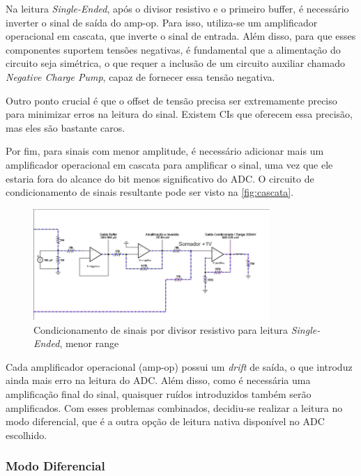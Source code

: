 Na leitura \textit{Single-Ended}, após o divisor resistivo e o primeiro buffer, é necessário inverter o sinal de saída do \gls{amp-op}. Para isso, utiliza-se um amplificador operacional em cascata, que inverte o sinal de entrada. Além disso, para que esses componentes suportem tensões negativas, é fundamental que a alimentação do circuito seja simétrica, o que requer a inclusão de um circuito auxiliar chamado \textit{Negative Charge Pump}, capaz de fornecer essa tensão negativa.

Outro ponto crucial é que o offset de tensão precisa ser extremamente preciso para minimizar erros na leitura do sinal. Existem \gls{CI}s que oferecem essa precisão, mas eles são bastante caros.

Por fim, para sinais com menor amplitude, é necessário adicionar mais um amplificador operacional em cascata para amplificar o sinal, uma vez que ele estaria fora do alcance do bit menos significativo do \gls{ADC}. O circuito de condicionamento de sinais resultante pode ser visto na \autoref{fig:cascata}.

\begin{figure}[htb!]
    \caption{Condicionamento de sinais por divisor resistivo para leitura \textit{Single-Ended}, menor range}
    \label{fig:cascata}
    \includegraphics[width=0.8\textwidth]{figuras/cascata.png}
    \fonte{}
\end{figure}

Cada amplificador operacional (amp-op) possui um \textit{drift} de saída, o que introduz ainda mais erro na leitura do \gls{ADC}. Além disso, como é necessária uma amplificação final do sinal, quaisquer ruídos introduzidos também serão amplificados. Com esses problemas combinados, decidiu-se realizar a leitura no modo diferencial, que é a outra opção de leitura nativa disponível no \gls{ADC} escolhido.

\subsubsection{Modo Diferencial}\label{modo-diferencial}

